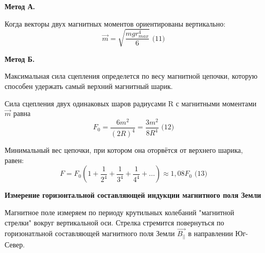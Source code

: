 \documentclass[a4paper,12pt]{article}
\begin{document}
\textbf{Метод А.} 

Когда векторы двух магнитных моментов ориентированы вертикально: $$ \vec{m} = \sqrt{\frac{mg{r_{max}^4}}{6}} \text{ (11)} $$ 


\noindent\textbf{Метод Б.}

Максимальная сила сцепления определется по весу магнитной цепочки, которую способен удержать самый верхний магнитный шарик.


Сила сцепления двух одинаковых шаров радиусами R с магнитными моментами $\vec{m}$ равна $$ F_0 = \frac{6m^2}{{(2R)}^4} = \frac{3m^2}{8R^4} \text{ (12)}$$

Минимальный вес цепочки, при котором она оторвётся от верхнего шарика, равен: $$ F = F_0(1 + \frac{1}{2^4} + \frac{1}{3^4} + \frac{1}{4^4} + ...) \approx 1,08F_0 \text{ (13)}$$

\textbf{Измерение горизонтальной составляющей индукции магнитного поля Земли}

Магнитное поле измеряем по периоду крутильных колебаний "магнитной стрелки" вокруг вертикальной оси. Стрелка стремится повернуться по горизонатльной составляющей магнитного поля Земли $\vec{B_{||}}$ в направлении Юг-Север. 

\end{document}
